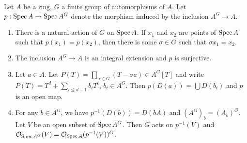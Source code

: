 \begin{exer}
	Let $A$ be a ring, $G$ a finite group of automorphisms of $A$. Let
	$p: \operatorname{Spec} A \to \operatorname{Spec} A^G$ denote the morphism induced by the inclusion
	$A^G \to A$.
	\begin{enumerate}[label=(\alph*)]
		\item There is a natural action of $G$ on $\operatorname{Spec} A$. If $x_1$
			and $x_2$ are points of $\operatorname{Spec} A$ such that $p(x_1) =
			p(x_2)$, then there is some $\sigma \in G$ such that
			$\sigma x_1 = x_2$.
		\item The inclusion $A^G \to A$ is an integral extension and
			$p$ is surjective.
		\item Let $a \in A$. Let $P(T) = \prod_{\sigma \in G}
			(T - \sigma a) \in A^G[T]$ and write $P(T) = T^d +
			\sum_{i \leq d - 1}b_iT^i$, $b_i \in A^G$. Then
			$p(D(a))$ = $\bigcup D(b_i)$ and $p$ is an open map.
		\item For any $b \in A^G$, we have $p^{-1}(D(b)) = D(bA)$ and
			$(A^G)_b = (A_b)^G$. Let $V$ be an open subset of
			$\operatorname{Spec} A^G$. Then $G$ acts on $p^{-1}(V)$ and
			$\mathcal{O}_{\operatorname{Spec} A^G}(V) = \mathcal{O}_{\operatorname{Spec} A}(p^{-1}(V))^G$.
	\end{enumerate}
\end{exer}
